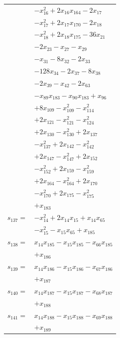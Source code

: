 \begin{longtable}{@{}r@{\;}l@{}}
 & \(\displaystyle -x_{16}^{2} +2x_{16}x_{164} -2x_{17}\) \\
 & \(\displaystyle -x_{17}^{2} +2x_{17}x_{170} -2x_{18}\) \\
 & \(\displaystyle -x_{18}^{2} +2x_{18}x_{175} -36x_{21}\) \\
 & \(\displaystyle -2x_{23} -x_{27} -x_{29}\) \\
 & \(\displaystyle -x_{31} -8x_{32} -2x_{33}\) \\
 & \(\displaystyle -128x_{34} -2x_{37} -8x_{38}\) \\
 & \(\displaystyle -2x_{39} -x_{42} -2x_{63}\) \\
 & \(\displaystyle -x_{89}x_{183} -x_{90}x_{183} +x_{96}\) \\
 & \(\displaystyle +8x_{109} -x_{109}^{2} -x_{114}^{2}\) \\
 & \(\displaystyle +2x_{121} -x_{121}^{2} -x_{124}^{2}\) \\
 & \(\displaystyle +2x_{130} -x_{130}^{2} +2x_{137}\) \\
 & \(\displaystyle -x_{137}^{2} +2x_{142} -x_{142}^{2}\) \\
 & \(\displaystyle +2x_{147} -x_{147}^{2} +2x_{152}\) \\
 & \(\displaystyle -x_{152}^{2} +2x_{159} -x_{159}^{2}\) \\
 & \(\displaystyle +2x_{164} -x_{164}^{2} +2x_{170}\) \\
 & \(\displaystyle -x_{170}^{2} +2x_{175} -x_{175}^{2}\) \\
 & \(\displaystyle +x_{183}\) \\[3pt]
\(s_{137}=\) & \(\displaystyle -x_{14}^{2} +2x_{14}x_{15} +x_{14}x_{65}\) \\
 & \(\displaystyle -x_{15}^{2} -x_{15}x_{65} +x_{185}\) \\[3pt]
\(s_{138}=\) & \(\displaystyle x_{14}x_{185} -x_{15}x_{185} -x_{66}x_{185}\) \\
 & \(\displaystyle +x_{186}\) \\[3pt]
\(s_{139}=\) & \(\displaystyle x_{14}x_{186} -x_{15}x_{186} -x_{67}x_{186}\) \\
 & \(\displaystyle +x_{187}\) \\[3pt]
\(s_{140}=\) & \(\displaystyle x_{14}x_{187} -x_{15}x_{187} -x_{68}x_{187}\) \\
 & \(\displaystyle +x_{188}\) \\[3pt]
\(s_{141}=\) & \(\displaystyle x_{14}x_{188} -x_{15}x_{188} -x_{69}x_{188}\) \\
 & \(\displaystyle +x_{189}\) \\[3pt]

\end{longtable}
